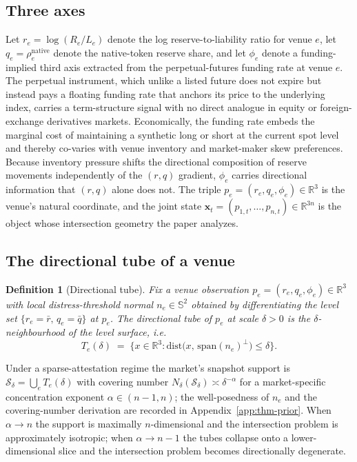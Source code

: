 \documentclass[12pt]{article}
\theoremstyle{sampledef}
\newtheorem{definition}{Definition}
\theoremstyle{sampleplain}
\theoremstyle{sampleremark}
\newcommand{\R}{\mathbb{R}}
\newcommand{\1}{\mathbf{1}}
\begin{document}
\subsection{Three axes}\label{sec:three-axes}

Let $r_e = \log(R_e / L_e)$ denote the log reserve-to-liability
ratio for venue $e$, let $q_e = \rho_e^{\mathrm{native}}$ denote the
native-token reserve share, and let $\phi_e$ denote a
funding-implied third axis extracted from the perpetual-futures
funding rate at venue $e$. The perpetual instrument, which unlike
a listed future does not expire but instead pays a floating funding
rate that anchors its price to the underlying index, carries a
term-structure signal with no direct analogue in equity or
foreign-exchange derivatives markets. Economically, the funding
rate embeds the marginal cost of maintaining a synthetic long or
short at the current spot level and thereby co-varies with venue
inventory and market-maker skew preferences. Because inventory
pressure shifts the directional composition of reserve movements
independently of the $(r,q)$ gradient, $\phi_e$ carries directional
information that $(r,q)$ alone does not. The triple
$p_e = (r_e, q_e, \phi_e) \in \R^3$ is the venue's natural
coordinate, and the joint state
$\boldsymbol{x}_t = (p_{1,t}, \dots, p_{n,t}) \in \R^{3n}$
is the object whose intersection geometry the paper analyzes.

\subsection{The directional tube of a venue}\label{sec:tube}

\begin{definition}[Directional tube]\label{def:tube}
Fix a venue observation $p_e = (r_e, q_e, \phi_e) \in \R^3$ with
local distress-threshold normal $n_e \in \mathbb{S}^2$ obtained by
differentiating the level set
$\{r_e = \bar r,\, q_e = \bar q\}$ at $p_e$. The directional tube of $p_e$ at scale $\delta > 0$ is the
$\delta$-neighbourhood of the level surface, i.e.
\[
T_e(\delta) \;=\; \bigl\{ x \in \R^3 :
\mathrm{dist}\bigl(x,\, \mathrm{span}(n_e)^{\perp}\bigr) \le \delta \bigr\}.
\]
\end{definition}

Under a sparse-attestation regime the market's snapshot support is
$\mathcal{S}_\delta = \bigcup_e T_e(\delta)$ with covering number
$N_\delta(\mathcal{S}_\delta) \asymp \delta^{-\alpha}$ for a
market-specific concentration exponent $\alpha \in (n{-}1, n)$; the
well-posedness of $n_e$ and the covering-number derivation are
recorded in Appendix~\ref{app:thm-prior}. When $\alpha \to n$ the
support is maximally $n$-dimensional and the intersection problem
is approximately isotropic; when $\alpha \to n{-}1$ the tubes
collapse onto a lower-dimensional slice and the intersection
problem becomes directionally degenerate.
\end{document}
